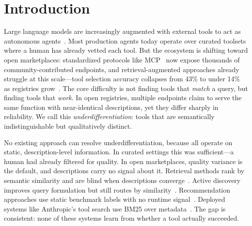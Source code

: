\section{Introduction}
\label{sec:intro}

Large language models are increasingly augmented with external tools to act as autonomous agents~\citep{schick2024toolformer, yao2023react, shen2024hugginggpt}. Most production agents today operate over curated toolsets where a human has already vetted each tool. But the ecosystem is shifting toward open marketplaces: standardized protocols like MCP~\citep{anthropic2025mcp} now expose thousands of community-contributed endpoints, and retrieval-augmented approaches already struggle at this scale---tool selection accuracy collapses from 43\% to under 14\% as registries grow~\citep{sun2025ragmcp}. The core difficulty is not finding tools that \emph{match} a query, but finding tools that \emph{work}. In open registries, multiple endpoints claim to serve the same function with near-identical descriptions, yet they differ sharply in reliability. We call this \emph{underdifferentiation}: tools that are semantically indistinguishable but qualitatively distinct.


No existing approach can resolve underdifferentiation, because all operate on static, description-level information. In curated settings this was sufficient---a human had already filtered for quality. In open marketplaces, quality variance is the default, and descriptions carry no signal about it. Retrieval methods rank by semantic similarity and are blind when descriptions converge~\citep{shi2024toolret}. Active discovery improves query formulation but still routes by similarity~\citep{fei2025mcpzero}. Recommendation approaches use static benchmark labels with no runtime signal~\citep{shi2026agentselect}. Deployed systems like Anthropic's tool search use BM25 over metadata~\citep{anthropic2025toolsearch}. The gap is consistent: none of these systems learn from whether a tool actually succeeded.

